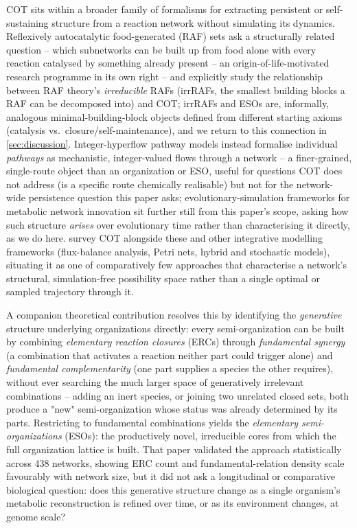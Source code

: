 \documentclass[nocrop]{bioinfo}
\begin{document}
COT sits within a broader family of formalisms for extracting persistent or self-sustaining
structure from a reaction network without simulating its dynamics. Reflexively autocatalytic
food-generated (RAF) sets \citep{steel2013minimal} ask a structurally related question --
which subnetworks can be built up from food alone with every reaction catalysed by something
already present -- an origin-of-life-motivated research programme in its own right
\citep{hordijk2018autocatalytic} -- and \citet{steel2013minimal} explicitly study the
relationship between RAF theory's \emph{irreducible} RAFs (irrRAFs, the smallest building
blocks a RAF can be decomposed into) and COT; irrRAFs and ESOs are, informally, analogous
minimal-building-block objects defined from different starting axioms (catalysis vs.\
closure/self-maintenance), and we return to this connection in \cref{sec:discussion}.
Integer-hyperflow pathway models \citep{andersen2017motifs} instead formalise individual
\emph{pathways} as mechanistic, integer-valued flows through a network -- a finer-grained,
single-route object than an organization or ESO, useful for questions COT does not address (is
a specific route chemically realisable) but not for the network-wide persistence question this
paper asks; evolutionary-simulation frameworks for metabolic network innovation
\citep{flamm2010evolution} sit further still from this paper's scope, asking how such structure
\emph{arises} over evolutionary time rather than characterising it directly, as we do here.
\citet{tenazinha2011survey} survey COT alongside these and other integrative modelling
frameworks (flux-balance analysis, Petri nets, hybrid and stochastic models), situating it as
one of comparatively few approaches that characterise a network's structural, simulation-free
possibility space rather than a single optimal or sampled trajectory through it.

A companion theoretical contribution \citep{velozbassi} resolves this by identifying the
\emph{generative} structure underlying organizations directly: every semi-organization can be
built by combining \emph{elementary reaction closures} (ERCs) through \emph{fundamental
synergy} (a combination that activates a reaction neither part could trigger alone) and
\emph{fundamental complementarity} (one part supplies a species the other requires), without
ever searching the much larger space of generatively irrelevant combinations -- adding an inert
species, or joining two unrelated closed sets, both produce a "new" semi-organization whose
status was already determined by its parts. Restricting to fundamental combinations yields the
\emph{elementary semi-organizations} (ESOs): the productively novel, irreducible cores from
which the full organization lattice is built. That paper validated the approach statistically
across 438 networks, showing ERC count and fundamental-relation density scale favourably with
network size, but it did not ask a longitudinal or comparative biological question: does this
generative structure change as a single organism's metabolic reconstruction is refined over
time, or as its environment changes, at genome scale?
\end{document}
